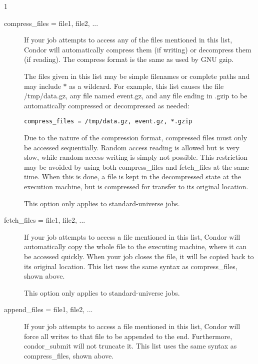 \begin{ManPage}{\label{man-condor-submit}}{1}
\begin{description}

\item[compress\_files = file1, file2, ...]

If your job attempts to access any of the files mentioned in this list,
Condor will automatically compress them (if writing) or decompress them (if reading).
The compress format is the same as used by GNU gzip.

The files given in this list may be simple filenames or complete paths and may
include $*$ as a wildcard.  For example, this list causes the file /tmp/data.gz,
any file named event.gz, and any file ending in .gzip to be automatically
compressed or decompressed as needed:

\begin{verbatim}
compress_files = /tmp/data.gz, event.gz, *.gzip
\end{verbatim}

Due to the nature of the compression format, compressed files must only
be accessed sequentially.  Random access reading is allowed but is very slow,
while random access writing is simply not possible.  This restriction may be
avoided by using both compress\_files and fetch\_files at the same time.  When
this is done, a file is kept in the decompressed state at the execution
machine, but is compressed for transfer to its original location.

This option only applies to standard-universe jobs.


\item[fetch\_files = file1, file2, ...]

If your job attempts to access a file mentioned in this list,
Condor will automatically copy the whole file to the executing machine,
where it can be accessed quickly.  When your job closes the file,
it will be copied back to its original location.
This list uses the same syntax as compress\_files, shown above.

This option only applies to standard-universe jobs.


\item[append\_files = file1, file2, ...]

If your job attempts to access a file mentioned in this list,
Condor will force all writes to that file to be appended to the end.
Furthermore, condor\_submit will not truncate it.
This list uses the same syntax as compress\_files, shown above.


\end{description}
\end{ManPage}
